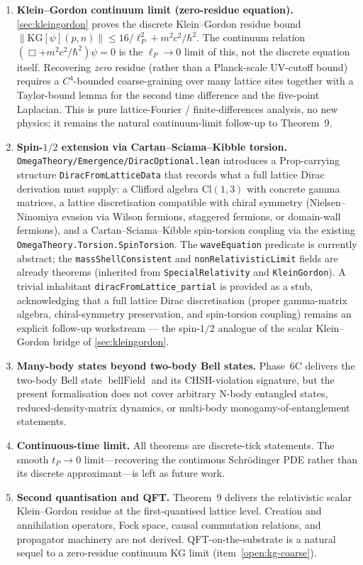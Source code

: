 \documentclass[11pt,a4paper,twoside]{article}
\theoremstyle{definition}
\newcommand{\lP}{\ell_P}
\newcommand{\tP}{t_P}
\newcommand{\code}[1]{\texttt{#1}}
\newcommand{\BellField}{\operatorname{bellField}}
\begin{document}
\begin{enumerate}
\item \textbf{Klein--Gordon continuum limit (zero-residue
  equation).}\label{open:kg-coarse}
  \cref{sec:kleingordon} proves the discrete Klein--Gordon
  residue bound $\|\mathrm{KG}[\psi](p, n)\| \le 16/\lP^{2} +
  m^{2} c^{2}/\hbar^{2}$. The continuum relation
  $(\Box + m^{2} c^{2}/\hbar^{2})\psi = 0$ is the $\lP \to 0$
  limit of this, not the discrete equation itself. Recovering
  \emph{zero} residue (rather than a Planck-scale UV-cutoff bound)
  requires a $C^{4}$-bounded coarse-graining over many lattice
  sites together with a Taylor-bound lemma for the second time
  difference and the five-point Laplacian. This is pure
  lattice-Fourier / finite-differences analysis, no new physics; it
  remains the natural continuum-limit follow-up to Theorem~9.

\item \textbf{Spin-$1/2$ extension via Cartan--Sciama--Kibble
  torsion.}\label{open:dirac}
  \code{OmegaTheory/Emergence/DiracOptional.lean} introduces a
  Prop-carrying structure \code{DiracFromLatticeData} that records
  what a full lattice Dirac derivation must supply: a Clifford
  algebra $\mathrm{Cl}(1, 3)$ with concrete gamma matrices, a lattice
  discretisation compatible with chiral symmetry (Nielsen--Ninomiya
  evasion via Wilson fermions, staggered fermions, or domain-wall
  fermions), and a Cartan--Sciama--Kibble spin-torsion coupling via
  the existing \code{OmegaTheory.Torsion.SpinTorsion}. The
  \code{waveEquation} predicate is currently abstract; the
  \code{massShellConsistent} and \code{nonRelativisticLimit} fields
  are already theorems (inherited from \code{SpecialRelativity} and
  \code{KleinGordon}). A trivial inhabitant
  \code{diracFromLattice\_partial} is provided as a stub,
  acknowledging that a full lattice Dirac discretisation (proper
  gamma-matrix algebra, chiral-symmetry preservation, and
  spin-torsion coupling) remains an explicit follow-up workstream
  --- the spin-$1/2$ analogue of the scalar Klein--Gordon bridge of
  \cref{sec:kleingordon}.

\item \textbf{Many-body states beyond two-body Bell states.}
  Phase~6C delivers the two-body Bell state $\BellField$ and its
  CHSH-violation signature, but the present formalisation does not
  cover arbitrary N-body entangled states, reduced-density-matrix
  dynamics, or multi-body monogamy-of-entanglement statements.

\item \textbf{Continuous-time limit.} All theorems are discrete-tick
  statements. The smooth $\tP\to 0$ limit---recovering the continuous
  Schr\"odinger PDE rather than its discrete approximant---is left
  as future work.

\item \textbf{Second quantisation and QFT.} Theorem~9 delivers the
  relativistic scalar Klein--Gordon residue at the first-quantised
  lattice level. Creation and annihilation operators, Fock space,
  causal commutation relations, and propagator machinery are not
  derived. QFT-on-the-substrate is a natural sequel to a zero-residue
  continuum KG limit (item~\ref{open:kg-coarse}).
\end{enumerate}
\end{document}

